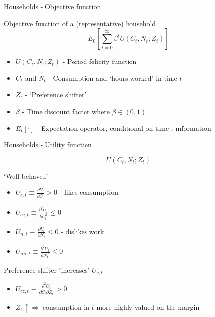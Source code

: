 \begin{frame}{Households - Objective function}

Objective function of a (representative) household
\begin{equation*}
E_{0} \left[ \sum\limits_{t=0}^{\infty} \beta^{t} U \left( C_{t}, N_{t}; Z_{t} \right) \right]
\end{equation*}

\begin{itemize}
\item 	$U\left(C_{t}, N_{t}; Z_{t} \right)$ 	- Period felicity function
\item 	$C_{t}$ and  $N_{t}$					- Consumption and `hours worked' in time $t$
\item 	$Z_{t}$								- `Preference shifter'
\item	$\beta$								- Time discount factor where $\beta \in (0,1)$
\item 	$E_{t}\left[ \cdot \right]$ 				- Expectation operator, conditional on time-$t$ information
\end{itemize}

\end{frame}



\begin{frame}{Households - Utility function}

\begin{huge}
\begin{equation*}
U \left( C_{t}, N_{t}; Z_{t} \right)
\end{equation*}
\end{huge}
`Well behaved'
\begin{itemize}
\item	$U_{c,t}\equiv\frac{\partial U_{t}}{\partial C_{t}}>0$ - likes consumption
\item	$U_{cc,t}\equiv\frac{\partial^2 U_{t}}{\partial C_{t}^2}\leq0$
\item	$U_{n,t}\equiv\frac{\partial U_{t}}{\partial N_{t}}\leq0$ - dislikes work
\item	$U_{nn,t}\equiv\frac{\partial^2 U_{t}}{\partial N_{t}^2}\leq0$
\end{itemize}
Preference shifter `increases' $U_{c,t}$
\begin{itemize}
\item	$U_{cz,t}\equiv\frac{\partial^2 U_{t}}{\partial C_{t} \partial Z_{t}}>0$
\item	$Z_{t}\uparrow \Rightarrow$ consumption in $t$ more highly valued on the margin
\end{itemize}

\end{frame}

